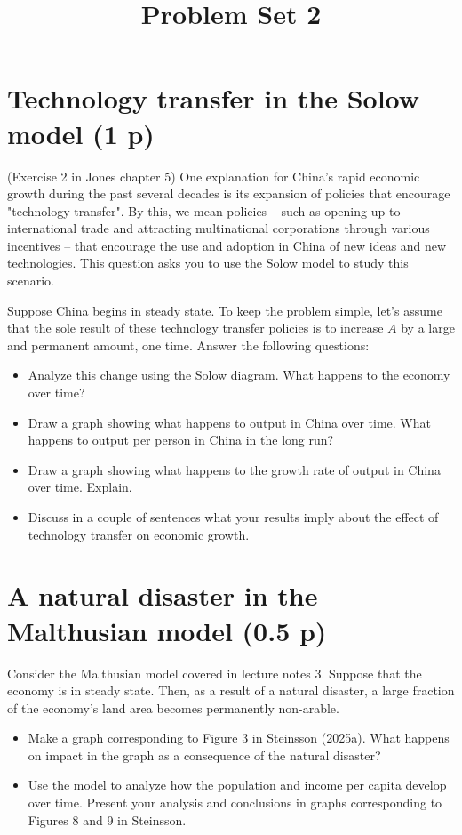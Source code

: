 \documentclass[12pt,a4paper]{article}
\title{Problem Set 2}        %
\begin{document}
\maketitle

\section{Technology transfer in the Solow model (1 p)}
(Exercise 2 in Jones chapter 5)
One explanation for China's rapid economic growth during the past several decades is its expansion of policies that encourage "technology transfer". By this, we mean policies -- such as opening up to international trade and attracting multinational corporations through various incentives -- that encourage the use and adoption in China of new ideas and new technologies. This question asks you to use the Solow model to study this scenario.

Suppose China begins in steady state. To keep the problem simple, let's assume that the sole result of these technology transfer policies is to increase $A$ by a large and permanent amount, one time. Answer the following questions:
\begin{itemize}
    \item[a.] Analyze this change using the Solow diagram. What happens to the economy over time?
    \item[b.] Draw a graph showing what happens to output in China over time. What happens to output per person in China in the long run?
    \item[c.] Draw a graph showing what happens to the growth rate of output in China over time. Explain.
    \item[d.] Discuss in a couple of sentences what your results imply about the effect of technology transfer on economic growth.
\end{itemize}

\section{A natural disaster in the Malthusian model (0.5 p)}
Consider the Malthusian model covered in lecture notes 3. Suppose that the economy is in steady state. Then, as a result of a natural disaster, a large fraction of the economy's land area becomes permanently non-arable.
\begin{itemize}
    \item[a.] Make a graph corresponding to Figure 3 in Steinsson (2025a). What happens on impact in the graph as a consequence of the natural disaster?
    \item[b.] Use the model to analyze how the population and income per capita develop over time. Present your analysis and conclusions in graphs corresponding to Figures 8 and 9 in Steinsson.
\end{itemize}
\end{document}
